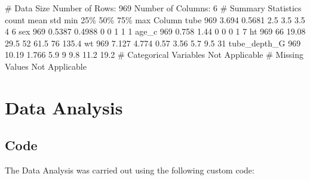 \documentclass[11pt]{article}
\begin{document}
\begin{codeoutput}
\# Data Size
Number of Rows: 969 
Number of Columns: 6
\# Summary Statistics
              count   mean    std  min  25\%  50\%  75\%   max
Column                                                     
tube            969  3.694 0.5681  2.5  3.5  3.5    4     6
sex             969 0.5387 0.4988    0    0    1    1     1
age\_c           969  0.758   1.44    0    0    0    1     7
ht              969     66  19.08 29.5   52 61.5   76 135.4
wt              969  7.127  4.774 0.57 3.56  5.7  9.5    31
tube\_depth\_G    969  10.19  1.766  5.9    9  9.8 11.2  19.2
\# Categorical Variables
Not Applicable
\# Missing Values
Not Applicable
\end{codeoutput}

\section{Data Analysis}
\subsection{{Code}}
The Data Analysis was carried out using the following custom code:
\end{document}

